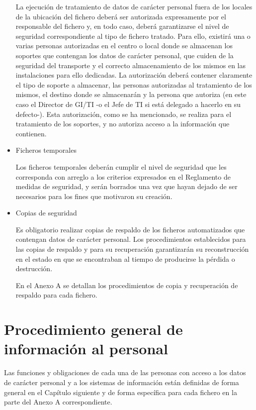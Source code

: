 \documentclass[a4paper,11pt,bibtotoc,noliststotoc]{scrbook}
\begin{document}
\begin{itemize}
La ejecución de tratamiento de datos de carácter personal fuera de los locales de la ubicación del fichero deberá ser autorizada expresamente por el responsable del fichero y, en todo caso, deberá garantizarse el nivel de seguridad correspondiente al tipo de fichero tratado. Para ello, existirá una o varias personas autorizadas en el centro o local donde se almacenan los soportes que contengan los datos de carácter personal, que cuiden de la seguridad del transporte y el correcto almacenamiento de los mismos en las instalaciones para ello dedicadas. La autorización deberá contener claramente el tipo de soporte a almacenar, las personas autorizadas al tratamiento de los mismos, el destino donde se almacenarán y la persona que autoriza (en este caso el Director de GI/TI -o el Jefe de TI si está delegado a hacerlo en su defecto-). Esta autorización, como se ha mencionado, se realiza para el tratamiento de los soportes, y no autoriza acceso a la información que contienen.


\item Ficheros temporales

Los ficheros temporales deberán cumplir el nivel de seguridad que les corresponda con arreglo a los criterios expresados en el Reglamento de medidas de seguridad, y serán borrados una vez que hayan dejado de ser necesarios para los fines que motivaron su creación.


\item Copias de seguridad

Es obligatorio realizar copias de respaldo de los ficheros automatizados que contengan datos de carácter personal. Los procedimientos establecidos para las copias de respaldo y para su recuperación garantizarán su reconstrucción en el estado en que se encontraban al tiempo de producirse la pérdida o destrucción.

En el Anexo A se detallan los procedimientos de copia y recuperación de respaldo para cada fichero.

\end{itemize}






\chapter{Procedimiento general de información al personal}

Las funciones y obligaciones de cada una de las personas con acceso a los datos de carácter personal y a los sistemas de información están definidas de forma general en el Capítulo siguiente y de forma específica para cada fichero en la parte del Anexo A correspondiente.
\end{document}
